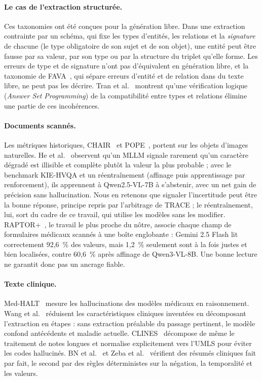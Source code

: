 \paragraph{Le cas de l'extraction structurée.} Ces taxonomies ont été conçues pour la génération libre. Dans une extraction contrainte par un schéma, qui fixe les types d'entités, les relations et la \emph{signature} de chacune (le type obligatoire de son sujet et de son objet), une entité peut être fausse par sa valeur, par son type ou par la structure du triplet qu'elle forme. Les erreurs de type et de signature n'ont pas d'équivalent en génération libre, et la taxonomie de FAVA~\cite{mishra2024fava}, qui sépare erreurs d'entité et de relation dans du texte libre, ne peut pas les décrire. Tran et al.~\cite{tran2025aspworkflow} montrent qu'une vérification logique (\textit{Answer Set Programming}) de la compatibilité entre types et relations élimine une partie de ces incohérences.

\paragraph{Documents scannés.} Les métriques historiques, CHAIR~\cite{rohrbach2018chair} et POPE~\cite{li2023pope}, portent sur les objets d'images naturelles. He et al.~\cite{he2025seeing} observent qu'un MLLM signale rarement qu'un caractère dégradé est illisible et complète plutôt la valeur la plus probable ; avec le benchmark KIE-HVQA et un réentraînement (affinage puis apprentissage par renforcement), ils apprennent à Qwen2.5-VL-7B à s'abstenir, avec un net gain de précision sans hallucination. Nous en retenons que signaler l'incertitude peut être la bonne réponse, principe repris par l'arbitrage de TRACE ; le réentraînement, lui, sort du cadre de ce travail, qui utilise les modèles sans les modifier. RAPTOR+~\cite{raptorplus2026}, le travail le plus proche du nôtre, associe chaque champ de formulaires médicaux scannés à une boîte englobante : Gemini 2.5 Flash lit correctement 92,6~\% des valeurs, mais 1,2~\% seulement sont à la fois justes et bien localisées, contre 60,6~\% après affinage de Qwen3-VL-8B. Une bonne lecture ne garantit donc pas un ancrage fiable.

\paragraph{Texte clinique.} Med-HALT~\cite{pal2023medhalt} mesure les hallucinations des modèles médicaux en raisonnement. Wang et al.~\cite{wang2024feature} réduisent les caractéristiques cliniques inventées en décomposant l'extraction en étapes : sans extraction préalable du passage pertinent, le modèle confond antécédents et maladie actuelle. CLINES~\cite{yang2025clines} décompose de même le traitement de notes longues et normalise explicitement vers l'UMLS pour éviter les codes hallucinés. BN et al.~\cite{bn2025fact} et Zeba et al.~\cite{zeba2026mitigating} vérifient des résumés cliniques fait par fait, le second par des règles déterministes sur la négation, la temporalité et les valeurs.

